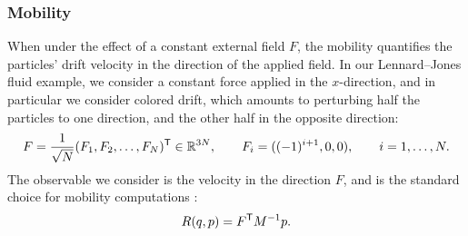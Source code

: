 \subsubsection{Mobility}
\label{subsubsec:mobility_num}
%
When under the effect of a constant external field $F$, the mobility quantifies the particles' drift velocity in the direction of the applied field. In our Lennard--Jones fluid example, we consider a constant force applied in the $x$-direction, and in particular we consider colored drift, which amounts to perturbing half the particles to one direction, and the other half in the opposite direction:
%
\begin{equation}
	F = \frac{1}{\sqrt{N}}(F_1,F_2,\dotsc,F_N)^\mathsf T \in \mathbb{R}^{3N}, \qquad F_i = ((-1)^{i+1}, 0, 0), \qquad i = 1,\dotsc,N.
\end{equation}
%
The observable we consider is the velocity in the direction $F$, and is the standard choice for mobility computations \cite[Section 5.2.2]{lelievre2016}:
%
\begin{equation}
	R(q,p) = F^\mathsf T M^{-1}p.
\end{equation}
%
%
